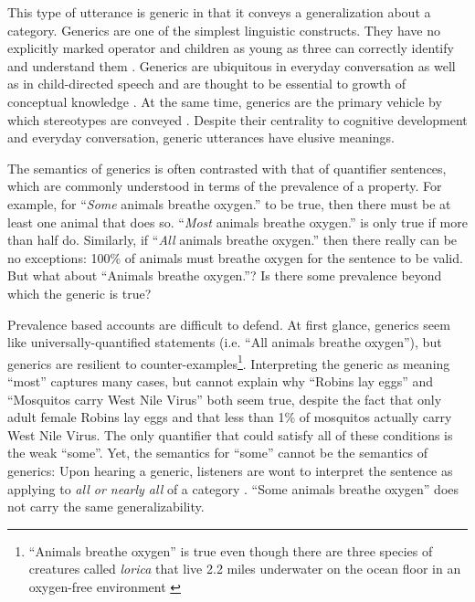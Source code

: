 \documentclass[10pt,letterpaper]{article}
\begin{document}
%
This type of utterance is generic \cite{Carlson1977, Leslie2008} in that it conveys a generalization about a category.  Generics are one of the simplest linguistic constructs. 
They have no explicitly marked operator and children as young as three can correctly identify and understand them \cite{Cimpian2008}. 
Generics are ubiquitous in everyday conversation as well as in child-directed speech \cite{Gelman2008} and are thought to be essential to growth of conceptual knowledge \cite{Gelman2004}. 
At the same time, generics are the primary vehicle by which stereotypes are conveyed \cite{GelmanEtAl2004, Cimpian2010motivation, Leslie2015}.
Despite their centrality to cognitive development and everyday conversation, generic utterances have elusive meanings. %

The semantics of generics is often contrasted with that of quantifier sentences, which are commonly understood in terms of the prevalence of a property. 
For example, for ``\emph{Some} animals breathe oxygen.'' to be true, then there must be at least one animal that does so. 
``\emph{Most} animals breathe oxygen.'' is only true if more than half do. 
Similarly, if ``\emph{All} animals breathe oxygen.'' then there really can be no exceptions: 100\% of animals must breathe oxygen for the sentence to be valid. 
But what about ``Animals breathe oxygen.''? 
Is there some prevalence beyond which the generic is true?

Prevalence based accounts are difficult to defend. 
At first glance, generics seem like universally-quantified statements (i.e. ``All animals breathe oxygen''), but generics are resilient to counter-examples\footnote{``Animals breathe oxygen'' is true even though there are three species of creatures called \emph{lorica} that live 2.2 miles underwater on the ocean floor in an oxygen-free environment \cite{Danovaro2010}}. 
Interpreting the generic as meaning ``most'' captures many cases, but cannot explain why ``Robins lay eggs'' and ``Mosquitos carry West Nile Virus'' both seem true, despite the fact that only adult female Robins lay eggs and that less than 1\% of mosquitos actually carry West Nile Virus. 
The only quantifier that could satisfy all of these conditions is the weak ``some''.  
Yet, the semantics for ``some'' cannot be the semantics of generics:  Upon hearing a generic, listeners are wont to interpret the sentence as applying to \emph{all or nearly all} of a category \cite{Gelman2002, Cimpian2010}. 
``Some animals breathe oxygen'' does not carry the same generalizability.
\end{document}
